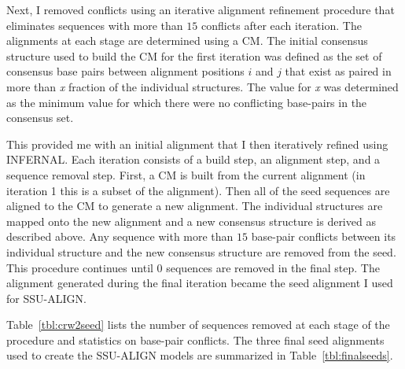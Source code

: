 Next, I removed conflicts using an iterative alignment refinement
procedure that eliminates sequences with more than $15$ conflicts after
each iteration. The alignments at each stage are determined using a
CM\@. The initial consensus structure used to build the CM for the first
iteration was defined as the set of consensus base pairs between
alignment positions $i$ and $j$ that exist as paired in more than
\emph{x} fraction of the individual structures. The value for \emph{x}
was determined as the minimum value for which there were no
conflicting base-pairs in the consensus set.

This provided me with an initial alignment that I then iteratively
refined using INFERNAL. Each iteration consists of a build
step, an alignment step, and a sequence removal step. First, a CM is
built from the current alignment (in iteration 1 this is a subset of
the  alignment). Then all of the seed sequences are aligned to the
CM to generate a new alignment. The individual structures are mapped
onto the new alignment and a new consensus structure is derived as
described above.  Any sequence with more than $15$ base-pair conflicts
between its individual structure and the new consensus structure are
removed from the seed.  This procedure continues until 0 sequences are
removed in the final step. The alignment generated during the final
iteration became the seed alignment I used for SSU-ALIGN.

Table~\ref{tbl:crw2seed} lists the number of sequences removed at each
stage of the procedure and statistics on base-pair conflicts. 
The three final seed alignments used to create the SSU-ALIGN 
models are summarized in Table~\ref{tbl:finalseeds}.


